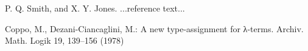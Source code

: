 \documentclass[preprint]{sigplanconf}
\begin{document}





\begin{thebibliography}{}
\softraggedright

P. Q. Smith, and X. Y. Jones. ...reference text...

Coppo, M., Dezani-Ciancaglini, M.: A new type-assignment for λ-terms. Archiv.
Math. Logik 19, 139–156 (1978)

\end{thebibliography}


\end{document}
